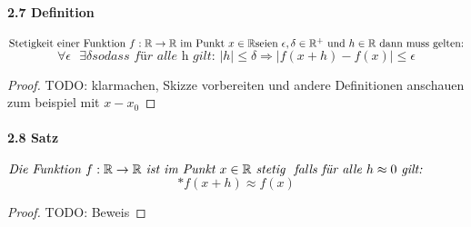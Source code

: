 \documentclass[a4paper]{article}
\begin{document}
\paragraph{2.7 Definition} $ \text{Stetigkeit einer Funktion } f:\mathbb{R} \to \mathbb{R} \text{ im Punkt } x \in \mathbb{R} \\
\text{seien }\epsilon, \delta  \in \mathbb{R}^+ \text{ und } h \in \mathbb{R} \text{ dann muss gelten:}$
$$ \forall \epsilon \text{ } \exists \delta \textit{sodass für alle h gilt: } |h| \leqslant \delta \Rightarrow |f(x + h) - f(x)| \leqslant \epsilon $$ 
\begin{proof}
      TODO: klarmachen, Skizze vorbereiten und andere Definitionen anschauen zum beispiel mit $ x - x_0 $ 
\end{proof}



\paragraph{2.8 Satz} $ \textit{Die Funktion } f:\mathbb{R} \to \mathbb{R} \textit{ ist im Punkt } x \in \mathbb{R} \textit{ stetig }
\textit{ falls für alle }\\ h \approx 0 \textit{ gilt:} $
$$ \text{*}f(x + h) \approx f(x) $$ 
\begin{proof}
      TODO: Beweis 
\end{proof}
\end{document}
